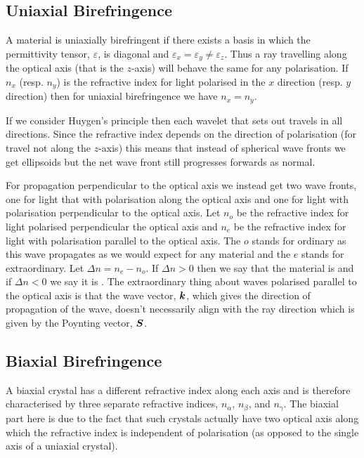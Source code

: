     \subsection{Uniaxial Birefringence}
    A material is uniaxially birefringent if there exists a basis in which the permittivity tensor, \(\varepsilon\), is diagonal and \(\varepsilon_x = \varepsilon_y \ne \varepsilon_z\).
    Thus a ray travelling along the optical axis (that is the \(z\)-axis) will behave the same for any polarisation.
    If \(n_x\) (resp. \(n_y\)) is the refractive index for light polarised in the \(x\) direction (resp. \(y\) direction) then for uniaxial birefringence we have \(n_x = n_y\).
    
    If we consider Huygen's principle then each wavelet that sets out travels in all directions.
    Since the refractive index depends on the direction of polarisation (for travel not along the \(z\)-axis) this means that instead of spherical wave fronts we get ellipsoids but the net wave front still progresses forwards as normal.
    
    For propagation perpendicular to the optical axis we instead get two wave fronts, one for light that with polarisation along the optical axis and one for light with polarisation perpendicular to the optical axis.
    Let \(n_o\) be the refractive index for light polarised perpendicular the optical axis and \(n_e\) be the refractive index for light with polarisation parallel to the optical axis.
    The \(o\) stands for ordinary as this wave propagates as we would expect for any material and the \(e\) stands for extraordinary.
    Let \(\Delta n = n_e - n_o\).
    If \(\Delta n > 0\) then we say that the material is  and if \(\Delta n < 0\) we say it is .
    The extraordinary thing about waves polarised parallel to the optical axis is that the wave vector, \(\bm{k}\), which gives the direction of propagation of the wave, doesn't necessarily align with the ray direction which is given by the Poynting vector, \(\bm{S}\).
    
    \subsection{Biaxial Birefringence}
    A biaxial crystal has a different refractive index along each axis and is therefore characterised by three separate refractive indices, \(n_\alpha\), \(n_\beta\), and \(n_\gamma\).
    The biaxial part here is due to the fact that such crystals actually have two optical axis along which the refractive index is independent of polarisation (as opposed to the single axis of a uniaxial crystal).
    
